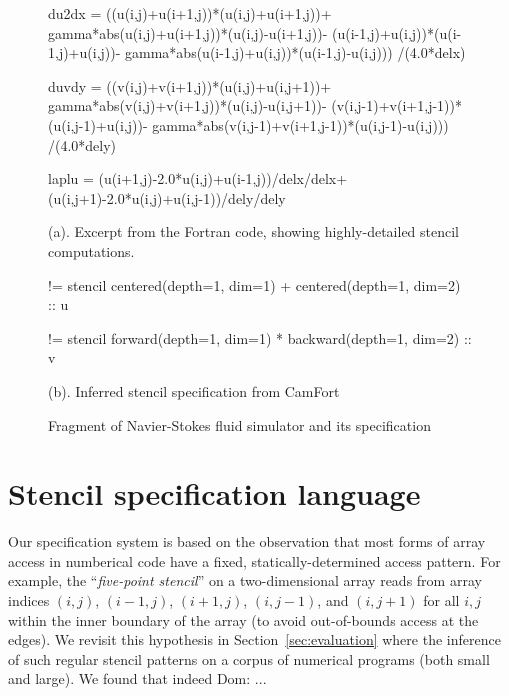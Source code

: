 \documentclass[9pt]{sigplanconf}
\newcommand{\dnote}[1]{\textcolor{darkpurple}{Dom: #1}}
\theoremstyle{definition}
\begin{document}
\begin{figure}
\begin{ExmVerbatim}[firstnumber=20]
du2dx = ((u(i,j)+u(i+1,j))*(u(i,j)+u(i+1,j))+
    gamma*abs(u(i,j)+u(i+1,j))*(u(i,j)-u(i+1,j))-
    (u(i-1,j)+u(i,j))*(u(i-1,j)+u(i,j))-
    gamma*abs(u(i-1,j)+u(i,j))*(u(i-1,j)-u(i,j)))
    /(4.0*delx)

duvdy = ((v(i,j)+v(i+1,j))*(u(i,j)+u(i,j+1))+
   gamma*abs(v(i,j)+v(i+1,j))*(u(i,j)-u(i,j+1))-
   (v(i,j-1)+v(i+1,j-1))*(u(i,j-1)+u(i,j))-
   gamma*abs(v(i,j-1)+v(i+1,j-1))*(u(i,j-1)-u(i,j)))
   /(4.0*dely)

laplu = (u(i+1,j)-2.0*u(i,j)+u(i-1,j))/delx/delx+
          (u(i,j+1)-2.0*u(i,j)+u(i,j-1))/dely/dely
\end{ExmVerbatim}
(a). Excerpt from the Fortran code,
showing highly-detailed stencil computations. \\


\begin{SpecVerbatim}[xleftmargin=0.3cm]
!=   stencil centered(depth=1, dim=1)
           + centered(depth=1, dim=2) :: u

!=   stencil forward(depth=1, dim=1)
           * backward(depth=1, dim=2) :: v
\end{SpecVerbatim}
(b). Inferred stencil specification from CamFort
\caption{Fragment of Navier-Stokes fluid simulator and its specification}
\label{ref:navier-stokes-fragment}
\end{figure}

\section{Stencil specification language}
\label{sec:lang}

Our specification system is based on the observation
that most forms of array access in numberical code have
a fixed, statically-determined access pattern. For example, the
``\emph{five-point stencil}'' on a two-dimensional array reads from array
indices $(i, j)$, $(i-1, j)$, $(i+1, j)$, $(i, j-1)$, and $(i, j+1)$
for all $i, j$ within the inner boundary of the array (to avoid
out-of-bounds access at the edges). We revisit this hypothesis
in Section~\ref{sec:evaluation} where the inference of
such regular stencil patterns on a corpus of numerical programs (both
small and large). We found that indeed \dnote{..}.
\end{document}
